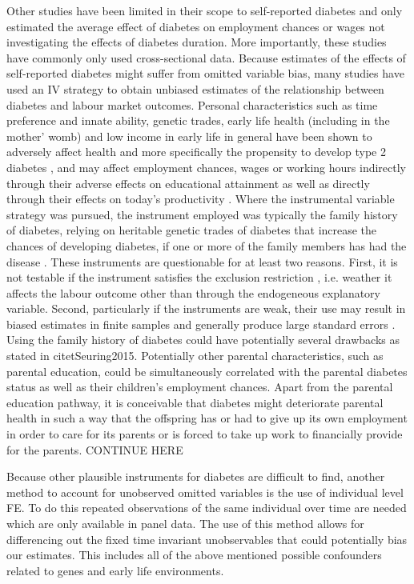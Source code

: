 Other studies have been limited in their scope to self-reported diabetes
and only estimated the average effect of diabetes on employment chances
or wages not investigating the effects of diabetes duration. More
importantly, these studies have commonly only used cross-sectional
data. Because estimates of the effects of self-reported diabetes might
suffer from omitted variable bias, many studies have used an \ac{IV}
strategy to obtain unbiased estimates of the relationship between
diabetes and labour market outcomes. Personal characteristics such
as time preference and innate ability, genetic trades, early life
health (including in the mother' womb) and low income in early life
in general have been shown to adversely affect health and more specifically
the propensity to develop type 2 diabetes \citep{VanEwijk2011a,Sotomayor2013,Li2010b},
and may affect employment chances, wages or working hours indirectly
through their adverse effects on educational attainment \citep{Ayyagari2011b}
as well as directly through their effects on today's productivity
\citep{Currie2013}. Where the instrumental variable strategy was
pursued, the instrument employed was typically the family history
of diabetes, relying on heritable genetic trades of diabetes that
increase the chances of developing diabetes, if one or more of the family members
has had the disease \citep{Brown2005,Latif2009,Minor2010a,Lin2011b,Seuring2015}.
These instruments are questionable for at least two reasons. First,
it is not testable if the instrument satisfies the exclusion restriction
 , i.e. weather it affects the labour outcome other than through
the endogeneous explanatory variable. Second, particularly if the
instruments are weak, their use may result in biased estimates in
finite samples and generally produce large standard errors \citep{Bound1995}. Using the family history of diabetes could have potentially several drawbacks as stated in citet{Seuring2015}. Potentially other parental characteristics, such as parental education, could be simultaneously correlated with the parental diabetes status as well as their children’s
employment chances. Apart from the parental education pathway, it is conceivable that diabetes might deteriorate parental health in such a way that the offspring has or had to give
up its own employment in order to care for its parents or is forced to take up work to financially provide for the parents. CONTINUE HERE

Because other plausible instruments for diabetes are difficult to
find, another method to account for unobserved omitted variables is
the use of individual level \ac{FE}. To do this repeated observations
of the same individual over time are needed which are only available
in panel data. The use of this method allows for differencing out
the fixed time invariant unobservables that could potentially bias
our estimates. This includes all of the above mentioned possible confounders
related to genes and early life environments.

